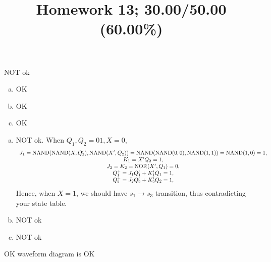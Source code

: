 \documentclass[10pt]{article} %
\title{Homework 13;
30.00/50.00 (60.00\%)
}
\newcommand{\NOR}{\operatorname{NOR}}
\newcommand{\NAND}{\operatorname{NAND}}
\begin{document}
\maketitle
{}
NOT ok
\begin{enumerate}[(a)]
  \item OK
  \item OK
  \item OK
\end{enumerate}
\begin{enumerate}[(a)]
  \item NOT ok.
    When ${Q_1,Q_2}=01,X=0$, \begin{equation*}
      \begin{array}[]{c}
        J_1=\NAND(\NAND(X,Q_2'),\NAND(X',Q_2))=\NAND(\NAND(0,0),\NAND(1,1))=\NAND(1,0)=1,\\
        K_1=X'Q_2=1,\\
        J_2=K_2=\NOR(X',Q_1)=0,\\
        Q_1^+=J_1Q_1'+K_1'Q_1=1,\\
        Q_2^+=J_2Q_2'+K_2'Q_2=1,\\
      \end{array}
    \end{equation*}
    Hence, when $X=1$, we should have $s_1\to s_3$ transition, thus contradicting your state table.
  \item NOT ok
  \item NOT ok
\end{enumerate}
OK
waveform diagram is OK
\end{document}
